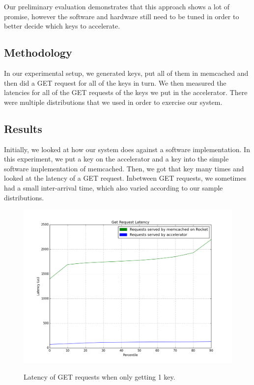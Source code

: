 Our preliminary evaluation demonstrates that this approach shows a lot of
promise, however the software and hardware still need to be tuned in order to
better decide which keys to accelerate.

\subsection{Methodology}

In our experimental setup, we generated keys, put all of them in memcached and
then did a GET request for all of the keys in turn. We then measured the
latencies for all of the GET requests of the keys we put in the accelerator.
There were multiple distributions that we used in order to exercise our system.


\subsection{Results}

Initially, we looked at how our system does against a software implementation.
In this experiment, we put a key on the accelerator and a key into the simple
software implementation of memcached. Then, we got that key many times and
looked at the latency of a GET request. Inbetween GET requests, we sometimes
had a small inter-arrival time, which also varied according to our sample
distributions.


\begin{figure}[t]
\begin{center}
\label{fig:one-req}
\includegraphics[width=\linewidth]{graph.png}
\caption{Latency of GET requests when only getting 1 key.}
\end{center}
\end{figure}

